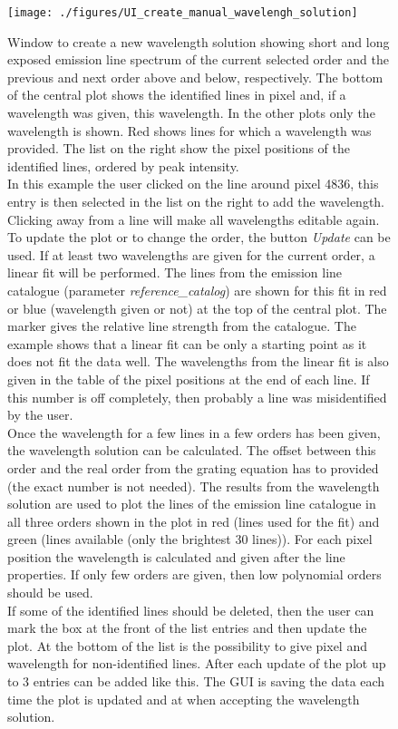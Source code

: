 \documentclass[10pt,a4paper]{article}
\begin{document}
\begin{figure} 
  \begin{center}
    \texttt{[image: ./figures/UI\_create\_manual\_wavelengh\_solution]}
  \end{center} 
  \caption{Window to create a new wavelength solution showing short and long exposed emission line spectrum of the current selected order and the previous and next order above and below, respectively. The bottom of the central plot shows the identified lines in pixel and, if a wavelength was given, this wavelength. In the other plots only the wavelength is shown. Red shows lines for which a wavelength was provided. The list on the right show the pixel positions of the identified lines, ordered by peak intensity. \\
    In this example the user clicked on the line around pixel 4836, this entry is then selected in the list on the right to add the wavelength. Clicking away from a line will make all wavelengths editable again. \\
    To update the plot or to change the order, the button \textit{Update} can be used. If at least two wavelengths are given for the current order, a linear fit will be performed. The lines from the emission line catalogue (parameter \textit{reference\_catalog}) are shown for this fit in red or blue (wavelength given or not) at the top of the central plot. The marker gives the relative line strength from the catalogue. The example shows that a linear fit can be only a starting point as it does not fit the data well. The wavelengths from the linear fit is also given in the table of the pixel positions at the end of each line. If this number is off completely, then probably a line was misidentified by the user. \\
    Once the wavelength for a few lines in a few orders has been given, the wavelength solution can be calculated. The offset between this order and the real order from the grating equation has to provided (the exact number is not needed). The results from the wavelength solution are used to plot the lines of the emission line catalogue in all three orders shown in the plot in red (lines used for the fit) and green (lines available (only the brightest 30 lines)). For each pixel position the wavelength is calculated and given after the line properties. If only few orders are given, then low polynomial orders should be used. \\
    If some of the identified lines should be deleted, then the user can mark the box at the front of the list entries and then update the plot. At the bottom of the list is the possibility to give pixel and wavelength for non-identified lines. After each update of the plot up to 3 entries can be added like this. The GUI is saving the data each time the plot is updated and at when accepting the wavelength solution.
    \label{Fig:UI_create_manual_wavelengh_solution}}
\end{figure}
\end{document}
